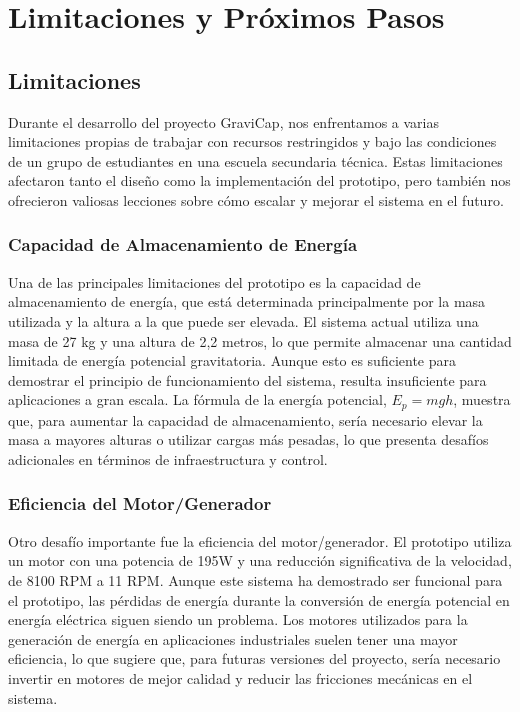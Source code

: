 \chapter{Limitaciones y Próximos Pasos}

    \section{Limitaciones}
        Durante el desarrollo del proyecto \textcolor{dark_violet}{GraviCap}, nos enfrentamos a varias limitaciones propias de trabajar con recursos restringidos y bajo las condiciones de un grupo de estudiantes en una escuela secundaria técnica. Estas limitaciones afectaron tanto el diseño como la implementación del prototipo, pero también nos ofrecieron valiosas lecciones sobre cómo escalar y mejorar el sistema en el futuro.\par
        
        \subsection{Capacidad de Almacenamiento de Energía}
        
            Una de las principales limitaciones del prototipo es la capacidad de almacenamiento de energía, que está determinada principalmente por la masa utilizada y la altura a la que puede ser elevada. El sistema actual utiliza una masa de 27 kg y una altura de 2,2 metros, lo que permite almacenar una cantidad limitada de energía potencial gravitatoria. Aunque esto es suficiente para demostrar el principio de funcionamiento del sistema, resulta insuficiente para aplicaciones a gran escala. La fórmula de la energía potencial, $E_p = mgh$, muestra que, para aumentar la capacidad de almacenamiento, sería necesario elevar la masa a mayores alturas o utilizar cargas más pesadas, lo que presenta desafíos adicionales en términos de infraestructura y control.\par
            
        \subsection{Eficiencia del Motor/Generador}
        
            Otro desafío importante fue la eficiencia del motor/generador. El prototipo utiliza un motor con una potencia de 195W y una reducción significativa de la velocidad, de 8100 RPM a 11 RPM. Aunque este sistema ha demostrado ser funcional para el prototipo, las pérdidas de energía durante la conversión de energía potencial en energía eléctrica siguen siendo un problema. Los motores utilizados para la generación de energía en aplicaciones industriales suelen tener una mayor eficiencia, lo que sugiere que, para futuras versiones del proyecto, sería necesario invertir en motores de mejor calidad y reducir las fricciones mecánicas en el sistema.\par
            
